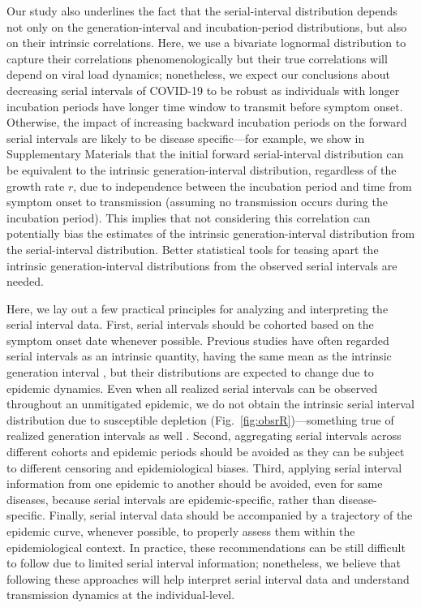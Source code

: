 \documentclass[12pt]{article}
\newcommand{\fref}[1]{Fig.~\ref{fig:#1}}
\begin{document}
Our study also underlines the fact that the serial-interval distribution depends not only on the generation-interval and incubation-period distributions, but also on their intrinsic correlations.
Here, we use a bivariate lognormal distribution to capture their correlations phenomenologically but their true correlations will depend on viral load dynamics;
nonetheless, we expect our conclusions about decreasing serial intervals of COVID-19 to be robust as individuals with longer incubation periods have longer time window to transmit before symptom onset.
Otherwise, the impact of increasing backward incubation periods on the forward serial intervals are likely to be disease specific---for example, we show in Supplementary Materials that the initial forward serial-interval distribution can be equivalent to the intrinsic generation-interval distribution, regardless of the growth rate $r$, due to independence between the incubation period and time from symptom onset to transmission (assuming no transmission occurs during the incubation period).
This implies that not considering this correlation can potentially bias the estimates of the intrinsic generation-interval distribution from the serial-interval distribution.
Better statistical tools for teasing apart the intrinsic generation-interval distributions from the observed serial intervals are needed.

Here, we lay out a few practical principles for analyzing and interpreting the serial interval data.
First, serial intervals should be cohorted based on the symptom onset date whenever possible.
Previous studies have often regarded serial intervals as an intrinsic quantity, having the same mean as the intrinsic generation interval \citep{svensson2007note,klinkenberg2011correlation,champredon2018equivalence, britton2019estimation}, but their distributions are expected to change due to epidemic dynamics.
Even when all realized serial intervals can be observed throughout an unmitigated epidemic, we do not obtain the intrinsic serial interval distribution due to susceptible depletion (\fref{obsrR})---something true of realized generation intervals as well \citep{park2020inferring}.
Second, aggregating serial intervals across different cohorts and epidemic periods should be avoided as they can be subject to different censoring and epidemiological biases.
Third, applying serial interval information from one epidemic to another should be avoided, even for same diseases, because serial intervals are epidemic-specific, rather than disease-specific.
Finally, serial interval data should be accompanied by a trajectory of the epidemic curve, whenever possible, to properly assess them within the epidemiological context.
In practice, these recommendations can be still difficult to follow due to limited serial interval information;
nonetheless, we believe that following these approaches will help interpret serial interval data and understand transmission dynamics at the individual-level.
\end{document}
